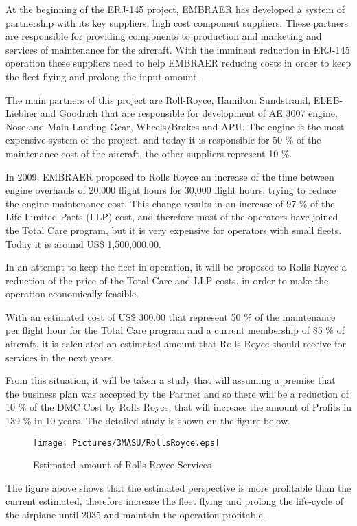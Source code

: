 
At the beginning of the ERJ-145 project, EMBRAER has developed a system of partnership with its key suppliers, high cost component suppliers. These partners are responsible for providing components to production and marketing and services of maintenance for the aircraft. With the imminent reduction in ERJ-145 operation these suppliers need to help EMBRAER reducing costs in order to keep the fleet flying and prolong the input amount.

The main partners of this project are Roll-Royce, Hamilton Sundstrand, ELEB-Liebher and Goodrich that are responsible for development of AE 3007 engine, Nose and Main Landing Gear, Wheels/Brakes and APU. The engine is the most expensive system of the project, and today it is responsible for 50 \% of the maintenance cost of the aircraft, the other suppliers represent 10 \%.

In 2009, EMBRAER proposed to Rolls Royce an increase of the time between engine overhauls of 20,000 flight hours for 30,000 flight hours, trying to reduce the engine maintenance cost. This change results in an increase of 97 \% of the Life Limited Parts (LLP) cost, and therefore most of the operators have joined the Total Care program, but it is very expensive for operators with small fleets. Today it is around US\$ 1,500,000.00.

In an attempt to keep the fleet in operation, it will be proposed to Rolls Royce a reduction of the price of the Total Care and LLP costs, in order to make the operation economically feasible.

With an estimated cost of US\$ 300.00 that represent 50 \% of the maintenance per flight hour for the Total Care program and a current membership of 85 \% of aircraft, it is calculated an estimated amount that Rolls Royce should receive for services in the next years.

From this situation, it will be taken a study that will assuming a premise that the business plan was accepted by the Partner and so there will be a reduction of 10 \% of the DMC Cost by Rolls Royce, that will increase the amount of Profits in 139 \% in 10 years. The detailed study is shown on the figure below.

\begin{figure}[H]
	\centering
	\texttt{[image: Pictures/3MASU/RollsRoyce.eps]}
	\caption{Estimated amount of Rolls Royce Services}
	\label{fig:RollsRoyce}
\end{figure}

The figure above shows that the estimated perspective is more profitable than the current estimated, therefore increase the fleet flying and prolong the life-cycle of the airplane until 2035 and maintain the operation profitable.

